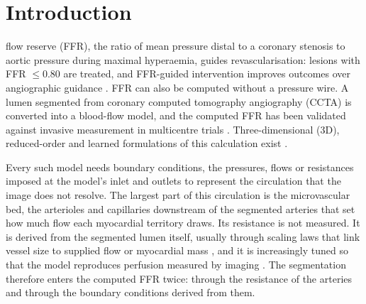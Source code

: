 \section{Introduction}
 flow reserve (FFR), the ratio of mean pressure distal to a coronary stenosis to aortic
pressure during maximal hyperaemia, guides revascularisation: lesions with FFR $\leq 0.80$ are treated, and
FFR-guided intervention improves outcomes over angiographic guidance \cite{tonino2009}. FFR can also be computed
without a pressure wire. A lumen segmented from coronary computed tomography angiography (CCTA) is converted into a
blood-flow model, and the computed FFR has been validated against invasive measurement in multicentre trials
\cite{taylor2013,norgaard2014}. Three-dimensional (3D), reduced-order and learned formulations of this calculation
exist \cite{kim2010,itu2016}.

Every such model needs boundary conditions, the pressures, flows or resistances imposed at the model's inlet and
outlets to represent the circulation that the image does not resolve. The largest part of this circulation is the
microvascular bed, the arterioles and capillaries downstream of the segmented arteries that set how much flow each
myocardial territory draws. Its resistance is not measured. It is derived from the segmented lumen itself, usually
through scaling laws that link vessel size to supplied flow or myocardial mass \cite{murray1926,choy2008}, and it is
increasingly tuned so that the model reproduces perfusion measured by imaging \cite{menon2024}. The segmentation
therefore enters the computed FFR twice: through the resistance of the arteries and through the boundary conditions
derived from them.

